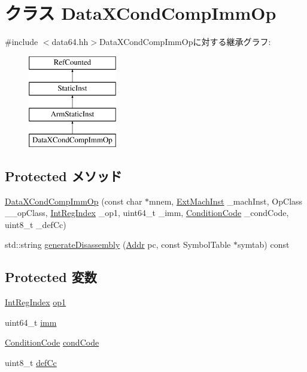 \hypertarget{classArmISA_1_1DataXCondCompImmOp}{
\section{クラス DataXCondCompImmOp}
\label{classArmISA_1_1DataXCondCompImmOp}
}


{\ttfamily \#include $<$data64.hh$>$}DataXCondCompImmOpに対する継承グラフ:\begin{figure}[H]
\begin{center}
\leavevmode
\includegraphics[height=4cm]{classArmISA_1_1DataXCondCompImmOp}
\end{center}
\end{figure}
\subsection*{Protected メソッド}
\begin{DoxyCompactItemize}
\item 
\hyperlink{classArmISA_1_1DataXCondCompImmOp_a641451cf942deeb1fd1275bccf8ed843}{DataXCondCompImmOp} (const char $\ast$mnem, \hyperlink{classStaticInst_a5605d4fc727eae9e595325c90c0ec108}{ExtMachInst} \_\-machInst, OpClass \_\-\_\-opClass, \hyperlink{namespaceArmISA_ae64680ba9fb526106829d6bf92fc791b}{IntRegIndex} \_\-op1, uint64\_\-t \_\-imm, \hyperlink{namespaceArmISA_ab8f08e777c4753720cff841f81da8e06}{ConditionCode} \_\-condCode, uint8\_\-t \_\-defCc)
\item 
std::string \hyperlink{classArmISA_1_1DataXCondCompImmOp_a95d323a22a5f07e14d6b4c9385a91896}{generateDisassembly} (\hyperlink{classm5_1_1params_1_1Addr}{Addr} pc, const SymbolTable $\ast$symtab) const 
\end{DoxyCompactItemize}
\subsection*{Protected 変数}
\begin{DoxyCompactItemize}
\item 
\hyperlink{namespaceArmISA_ae64680ba9fb526106829d6bf92fc791b}{IntRegIndex} \hyperlink{classArmISA_1_1DataXCondCompImmOp_a4c465c43ad568f8bcf8ae71480e9cfea}{op1}
\item 
uint64\_\-t \hyperlink{classArmISA_1_1DataXCondCompImmOp_a2b4406ad2843b5aa12d244d01d8fdc69}{imm}
\item 
\hyperlink{namespaceArmISA_ab8f08e777c4753720cff841f81da8e06}{ConditionCode} \hyperlink{classArmISA_1_1DataXCondCompImmOp_a273dc0fe84de8f4a9cf52aaf8dc27885}{condCode}
\item 
uint8\_\-t \hyperlink{classArmISA_1_1DataXCondCompImmOp_a67b4730d4f641c62c31e1b7724f93433}{defCc}
\end{DoxyCompactItemize}


